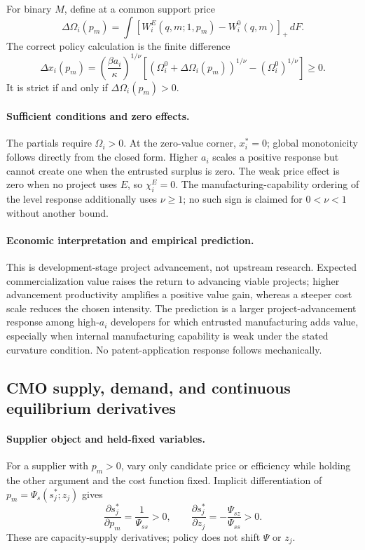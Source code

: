 For binary \(M\), define at a common support price
\[
  \Delta\Omega_i(p_m)
  =
  \int[W_i^E(q,m;1,p_m)-W_i^0(q,m)]_+\,dF.
\]
The correct policy calculation is the finite difference
\begin{equation}
  \Delta x_i(p_m)
  =
  \left(\frac{\beta a_i}{\kappa}\right)^{1/\nu}
  \left[
    (\Omega_i^0+\Delta\Omega_i(p_m))^{1/\nu}
    -(\Omega_i^0)^{1/\nu}
  \right]
  \geq0.
  \label{eq:p15-fixed-advancement-gain}
\end{equation}
It is strict if and only if \(\Delta\Omega_i(p_m)>0\).

\paragraph{Sufficient conditions and zero effects.}
The partials require \(\Omega_i>0\). At the zero-value corner, \(x_i^*=0\);
global monotonicity follows directly from the closed form. Higher \(a_i\)
scales a positive response but cannot create one when the entrusted surplus is
zero. The weak price effect is zero when no project uses \(E\), so
\(\chi_i^E=0\). The manufacturing-capability ordering of the level response
additionally uses \(\nu\geq1\); no such sign is claimed for
\(0<\nu<1\) without another bound.

\paragraph{Economic interpretation and empirical prediction.}
This is development-stage project advancement, not upstream research.
Expected commercialization value raises the return to advancing viable
projects; higher advancement productivity amplifies a positive value gain,
whereas a steeper cost scale reduces the chosen intensity. The prediction is
a larger project-advancement response among high-\(a_i\) developers for which
entrusted manufacturing adds value, especially when internal manufacturing
capability is weak under the stated curvature condition. No patent-application
response follows mechanically.

\subsection{CMO supply, demand, and continuous equilibrium derivatives}
\label{subsec:p15-cmo-continuous}

\paragraph{Supplier object and held-fixed variables.}
For a supplier with \(p_m>0\), vary only candidate price or efficiency while
holding the other argument and the cost function fixed. Implicit
differentiation of \(p_m=\Psi_s(s_j^*;z_j)\) gives
\begin{equation}
  \frac{\partial s_j^*}{\partial p_m}
  =
  \frac{1}{\Psi_{ss}}>0,
  \qquad
  \frac{\partial s_j^*}{\partial z_j}
  =
  -\frac{\Psi_{sz}}{\Psi_{ss}}>0.
  \label{eq:p15-supplier-partials}
\end{equation}
These are capacity-supply derivatives; policy does not shift
\(\Psi\) or \(z_j\).


